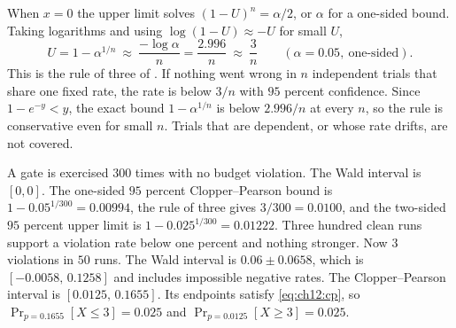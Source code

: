 When $x=0$ the upper limit solves $(1-U)^n=\alpha/2$, or $\alpha$ for a one-sided bound. Taking logarithms and using $\log(1-U)\approx-U$ for small $U$,
\begin{equation}
U=1-\alpha^{1/n}\ \approx\ \frac{-\log\alpha}{n}=\frac{2.996}{n}\ \approx\ \frac3n\qquad(\alpha=0.05,\ \text{one-sided}).
\label{eq:ch12:rule-of-three}
\end{equation}
This is the rule of three of \citet{hanley1983}. If nothing went wrong in $n$ independent trials that share one fixed rate, the rate is below $3/n$ with $95$ percent confidence. Since $1-e^{-y}<y$, the exact bound $1-\alpha^{1/n}$ is below $2.996/n$ at every $n$, so the rule is conservative even for small $n$. Trials that are dependent, or whose rate drifts, are not covered.

\begin{example}\label{ex:ch12:zero}
A gate is exercised $300$ times with no budget violation. The Wald interval is $[0,0]$. The one-sided $95$ percent Clopper--Pearson bound is $1-0.05^{1/300}=0.00994$, the rule of three gives $3/300=0.0100$, and the two-sided $95$ percent upper limit is $1-0.025^{1/300}=0.01222$. Three hundred clean runs support a violation rate below one percent and nothing stronger. Now $3$ violations in $50$ runs. The Wald interval is $0.06\pm0.0658$, which is $[-0.0058,\,0.1258]$ and includes impossible negative rates. The Clopper--Pearson interval is $[0.0125,\,0.1655]$. Its endpoints satisfy \cref{eq:ch12:cp}, so $\Pr_{p=0.1655}[X\le3]=0.025$ and $\Pr_{p=0.0125}[X\ge3]=0.025$.
\end{example}

